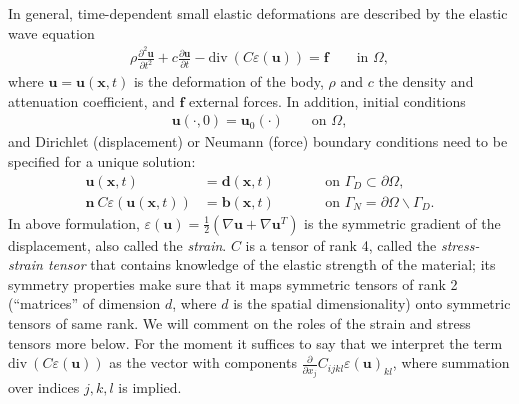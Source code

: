 \documentclass{article}
\renewcommand{\vec}[1]{\mathbf{#1}}
\renewcommand{\div}{\mathrm{div}\ }
\begin{document}
In general, time-dependent small elastic deformations are described by the
elastic wave equation
\begin{gather}
  \rho \frac{\partial^2 \vec u}{\partial t^2} 
  + c \frac{\partial \vec u}{\partial t}
  - \div ( C \varepsilon(\vec u)) = \vec f
  \qquad
  \text{in $\Omega$},
\end{gather}
where $\vec u=\vec u (\vec x,t)$ is the deformation of the body, $\rho$
and $c$ the density and attenuation coefficient, and $\vec f$ external forces.
In addition, initial conditions
\begin{align}
  \vec u(\cdot, 0) = \vec u_0(\cdot)
  \qquad
  \text{on $\Omega$},
\end{align}
and Dirichlet (displacement) or Neumann (force) boundary conditions need
to be specified for a unique solution:
\begin{align}
  \vec u(\vec x,t) &= \vec d(\vec x,t)
  \qquad
  &&\text{on $\Gamma_D\subset\partial\Omega$},  
  \\
  \vec n \ C \varepsilon(\vec u(\vec x,t)) &= \vec b(\vec x,t)
  \qquad
  &&\text{on $\Gamma_N=\partial\Omega\backslash\Gamma_D$}.
\end{align}
In above formulation, $\varepsilon(\vec u)= \tfrac 12 (\nabla \vec u + \nabla
\vec u^T)$ is the symmetric gradient of the displacement, also called the
\textit{strain}. $C$ is a tensor of rank 4, called the \textit{stress-strain
  tensor} that contains knowledge of the elastic strength of the material; its
symmetry properties make sure that it maps symmetric tensors of rank 2
(``matrices'' of dimension $d$, where $d$ is the spatial dimensionality) onto
symmetric tensors of same rank. We will comment on the roles of the strain and
stress tensors more below. For the moment it suffices to say that we interpret
the term $\div ( C \varepsilon(\vec u))$ as the vector with components $\tfrac
\partial{\partial x_j} C_{ijkl} \varepsilon(\vec u)_{kl}$, where summation
over indices $j,k,l$ is implied.
\end{document}
